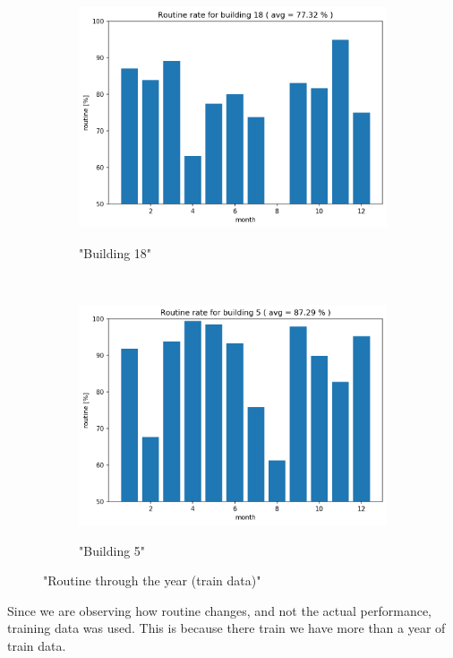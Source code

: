 \begin{figure}[H]
    \begin{subfigure}{.5\textwidth}
		\caption{"Building 18"}
		\includegraphics[width=1\linewidth]{../Figures/EC/b18year.png}
		\label{fig:ec_b18year}
	\end{subfigure}%
    ~ 
    \begin{subfigure}{.5\textwidth}
		\caption{"Building 5"}
		\includegraphics[width=1\linewidth]{../Figures/EC/b5year.png}
		\label{fig:ec_b5year}
	\end{subfigure}%
	\label{fig:ec_year}
	\caption{"Routine through the year (train data)"}
\end{figure}

Since we are observing how routine changes, and not the actual performance, training data was used.
This is because there train we have more than a year of train data.

